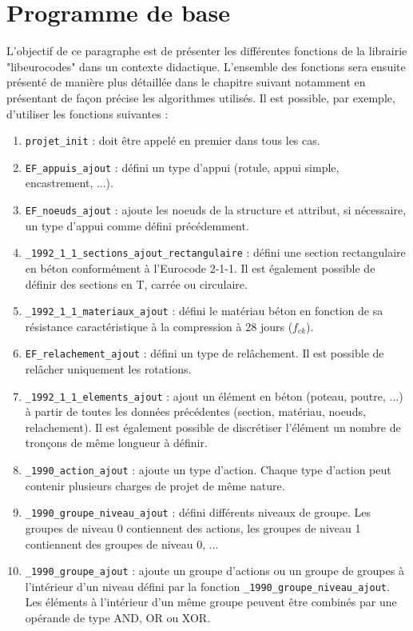 \documentclass{article}
\begin{document}
\section{Programme de base}
L'objectif de ce paragraphe est de présenter les différentes fonctions de la librairie "libeurocodes" dans un contexte didactique. L'ensemble des fonctions sera ensuite présenté de manière plus détaillée dans le chapitre suivant notamment en présentant de façon précise les algorithmes utilisés. Il est possible, par exemple, d'utiliser les fonctions suivantes :
\par
\begin{enumerate}
    \item {\texttt{projet\_init}} : doit être appelé en premier dans tous les cas.
    \item {\texttt{EF\_appuis\_ajout}} : défini un type d'appui (rotule, appui simple, encastrement, ...).
    \item {\texttt{EF\_noeuds\_ajout}} : ajoute les noeuds de la structure et attribut, si nécessaire, un type d'appui comme défini précédemment.
    \item {\texttt{\_1992\_1\_1\_sections\_ajout\_rectangulaire}} : défini une section rectangulaire en béton conformément à l'Eurocode 2-1-1. Il est également possible de définir des sections en T, carrée ou circulaire.
    \item {\texttt{\_1992\_1\_1\_materiaux\_ajout}} : défini le matériau béton en fonction de sa résistance caractéristique à la compression à 28 jours ($f_{ck}$).
    \item {\texttt{EF\_relachement\_ajout}} : défini un type de relâchement. Il est possible de relâcher uniquement les rotations.
    \item {\texttt{\_1992\_1\_1\_elements\_ajout}} : ajout un élément en béton (poteau, poutre, ...) à partir de toutes les données précédentes (section, matériau, noeuds, relachement). Il est également possible de discrétiser l'élément un nombre de tronçons de même longueur à définir.
    \item {\texttt{\_1990\_action\_ajout}} : ajoute un type d'action. Chaque type d'action peut contenir plusieurs charges de projet de même nature.
    \item {\texttt{\_1990\_groupe\_niveau\_ajout}} : défini différents niveaux de groupe. Les groupes de niveau 0 contien\-nent des actions, les groupes de niveau 1 contien\-nent des groupes de niveau 0, ...
    \item {\texttt{\_1990\_groupe\_ajout}} : ajoute un groupe d'actions ou un groupe de groupes à l'intérieur d'un niveau défini par la fonction {\texttt{\_1990\_groupe\_niveau\_ajout}}. Les éléments à l'intérieur d'un même groupe peuvent être combinés par une opérande de type AND, OR ou XOR.

\end{enumerate}
\end{document}
